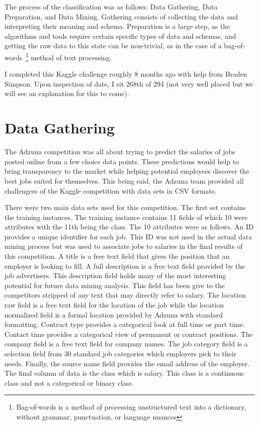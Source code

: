 \documentclass[conference]{IEEEtran}
\begin{document}
The process of the classification was as follows: Data Gathering, Data Preparation, and Data Mining. Gathering consists of 
collecting the data and interpreting their meaning and schema. Preparation is a large step, as the algorithms and tools require 
certain specific types of data and schemas, and getting the raw data to this state can be non-trivial, as in the case of a 
bag-of-words~\footnote{Bag-of-words is a method of processing unstructured text into a dictionary, without grammar, 
punctuation, or language nuances} method of text processing.

I completed this Kaggle challenge roughly 8 months ago with help from Braden Simpson. Upon inspection of date, I sit 268th of 294
(not very well placed but we will see an explanation for this to come).

\section{Data Gathering}

The Adzuna competition was all about trying to predict the salaries of jobs posted
online from a few choice data points. These predictions would help to bring transparency 
to the market while helping potential employees discover the best jobs suited for themselves. 
This being said, the Adzuna team provided all challengers of the Kaggle competition 
with data sets in CSV formats.

There were two main data sets used for this competition. The first set contains the training instances. 
The training instance contains 11 fields of which 10 were attributes with the 11th being the class. 
The 10 attributes were as follows. An ID provides a unique identifier for each job. This ID was 
not used in the actual data mining process but was used to associate jobs to salaries
in the final results of this competition. A title is a free text field that gives the position that an
employer is looking to fill. A full description is a free text field provided by the
job advertisers. This description field holds many of the most interesting potential for future data
mining analysis. This field has been give to the competitors stripped of any text that may directly
refer to salary. The location raw field is a free text field for the location of the job while the
location normalized field is a formal location provided by Adzuna with standard formatting. Contract type
provides a categorical look at full time or part time. Contact time provides a categorical view of
permanent or contract positions. The company field is a free text field for company names. The job category
field is a selection field from 30 standard job categories which employers pick to their needs. Finally, the source
name field provides the email address of the employer. The final column of data is the class which is salary. 
This class is a continuous class and not a categorical or binary class.
\end{document}
